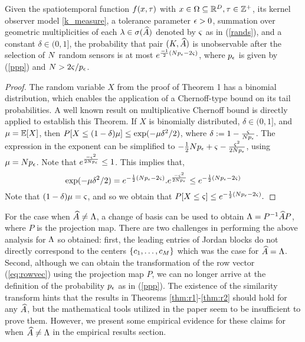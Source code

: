 \begin{theorem}\label{thm:r2}
	Given the spatiotemporal function $ f(x,\tau) $ with $ x \in \Omega \subseteq  \mathbb{R}^{D}, \tau\in \mathbb{Z}^+  $, its kernel observer model \eqref{k_measure}, a tolerance parameter $\epsilon>0$, summation over geometric multiplicities of each $ \lambda \in \sigma(\widehat{A}) $ denoted by $ \varsigma  $ as in  (\ref{rands}), and a constant $ \delta \in (0,1] $, the probability that pair $ (K, \widehat{A}) $ is unobservable after the selection of $ N $ random sensors is at most $ e^{\frac{-1}{2}(N p_{\epsilon}-2\varsigma)} $, where $ p_{\epsilon} $ is given by (\ref{ppp}) and $ N > 2\varsigma/p_{\epsilon} $.
\end{theorem}
\begin{proof}
	The random variable $ X $ from the proof of Theorem 1 has a binomial distribution, which enables the application of a Chernoff-type bound on its tail probabilities. A well known result  on multiplicative Chernoff bound \cite{motwani2010randomized} is directly applied to establish this Theorem. If $ X $ is binomially distributed, $ \delta \in (0,1] $, and $ \mu = \mathbb{E}[X] $, then $ P[X\leq(1-\delta)\mu] \leq \exp(-\mu \delta^2/2) $, where $ \delta := 1-\frac{\varsigma}{N p_{\epsilon}}$.  The expression in the exponent can be simplified to $ -\frac{1}{2}N p_{\epsilon}+\varsigma - \frac{\varsigma^2}{2N p_{\epsilon}} $, using $ \mu = N p_{\epsilon} $. Note that $ e^{\frac{-\varsigma^2}{2N p_{\epsilon}}} \leq 1$. This implies that,
	\begin{equation*}
	\exp(-\mu \delta^2/2) =  e^{-\frac{1}{2}(N p_{\epsilon}-2\varsigma)}.e^{\frac{-\varsigma^2}{2N p_{\epsilon}}}\leq e^{-\frac{1}{2}(N p_{\epsilon}-2\varsigma)}
	\end{equation*}
	Note that $ (1-\delta)\mu = \varsigma $, and so we obtain that $ P[X\leq\varsigma] \leq e^{-\frac{1}{2}(N p_{\epsilon}-2\varsigma)}. $
\end{proof}


For the case when $ \widehat{A} \neq \Lambda $, a change of basis can be used to obtain $ \Lambda = P^{-1}\widehat{A} P $, where $ P $ is the projection map. There are two challenges in performing the above analysis for $\Lambda$ so obtained: first, the leading entries of Jordan blocks do not directly correspond to the centers $\{ c_1,\dots,c_M\}$ which was the case for $ \widehat{A} = \Lambda $. Second, although we can obtain the transformation of the row vector (\ref{eq:rowvec}) using the projection map $P$, we can no longer arrive at the definition of the probability $p_{\epsilon}$ as in  (\ref{ppp}). The existence of the similarity transform hints that the results in Theorems \ref{thm:r1}-\ref{thm:r2} should hold for any $ \widehat{A}$, but the mathematical tools utilized in the paper seem to be insufficient to prove them. However, we present some empirical evidence for these claims for when $ \widehat{A} \neq \Lambda $  in the empirical results section.%


